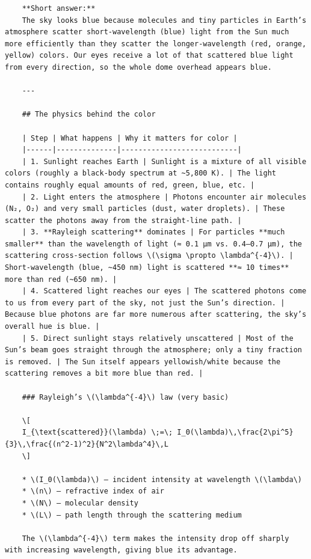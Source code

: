 \begin{verbatim}
    **Short answer:**  
    The sky looks blue because molecules and tiny particles in Earth’s atmosphere scatter short‑wavelength (blue) light from the Sun much more efficiently than they scatter the longer‑wavelength (red, orange, yellow) colors. Our eyes receive a lot of that scattered blue light from every direction, so the whole dome overhead appears blue.
    
    ---
    
    ## The physics behind the color
    
    | Step | What happens | Why it matters for color |
    |------|--------------|---------------------------|
    | 1. Sunlight reaches Earth | Sunlight is a mixture of all visible colors (roughly a black‑body spectrum at ~5,800 K). | The light contains roughly equal amounts of red, green, blue, etc. |
    | 2. Light enters the atmosphere | Photons encounter air molecules (N₂, O₂) and very small particles (dust, water droplets). | These scatter the photons away from the straight‑line path. |
    | 3. **Rayleigh scattering** dominates | For particles **much smaller** than the wavelength of light (≈ 0.1 µm vs. 0.4–0.7 µm), the scattering cross‑section follows \(\sigma \propto \lambda^{-4}\). | Short‑wavelength (blue, ~450 nm) light is scattered **≈ 10 times** more than red (~650 nm). |
    | 4. Scattered light reaches our eyes | The scattered photons come to us from every part of the sky, not just the Sun’s direction. | Because blue photons are far more numerous after scattering, the sky’s overall hue is blue. |
    | 5. Direct sunlight stays relatively unscattered | Most of the Sun’s beam goes straight through the atmosphere; only a tiny fraction is removed. | The Sun itself appears yellowish/white because the scattering removes a bit more blue than red. |
    
    ### Rayleigh’s \(\lambda^{-4}\) law (very basic)
    
    \[
    I_{\text{scattered}}(\lambda) \;=\; I_0(\lambda)\,\frac{2\pi^5}{3}\,\frac{(n^2-1)^2}{N^2\lambda^4}\,L
    \]
    
    * \(I_0(\lambda)\) – incident intensity at wavelength \(\lambda\)  
    * \(n\) – refractive index of air  
    * \(N\) – molecular density  
    * \(L\) – path length through the scattering medium  
    
    The \(\lambda^{-4}\) term makes the intensity drop off sharply with increasing wavelength, giving blue its advantage.
    

\end{verbatim}

